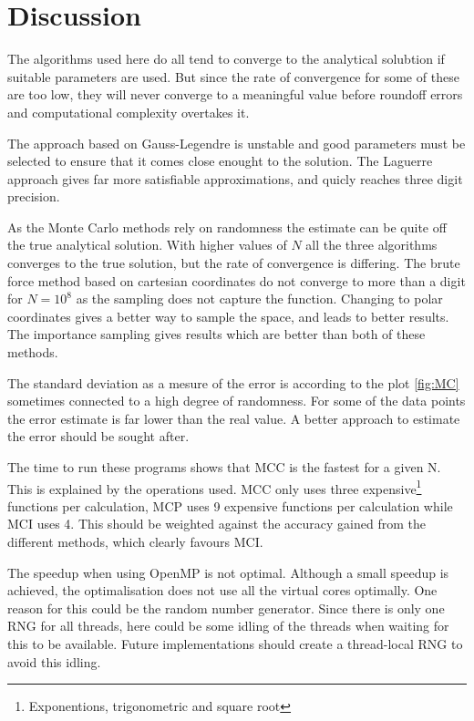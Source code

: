 \documentclass[11pt,a4paper,english,final]{article}
\numberwithin{equation}{section}
\begin{document}
\section{Discussion}

The algorithms used here do all tend to converge to the analytical 
solubtion if 
suitable parameters are used. But since the rate of convergence for 
some of these are too low, they will never converge to a meaningful 
value before roundoff errors and computational complexity overtakes it.

The approach based on Gauss-Legendre is unstable and good parameters 
must be selected to ensure that it comes close enought to the solution.
The Laguerre approach gives far more satisfiable approximations, and 
quicly reaches three digit precision.


As the Monte Carlo methods rely on randomness the estimate can be quite 
off the true analytical solution. With higher values of $N$ all the three 
algorithms converges to the true solution, but the rate of convergence
is differing. 
The brute force method based on cartesian coordinates do not converge 
to more than a digit for $N = 10^8$ as the sampling does not capture 
the function. 
Changing to polar coordinates gives a better way to sample the space, 
and leads to better results. The 
importance sampling gives results which are better than both of these 
methods.

The standard deviation as a mesure of the error is according to the 
plot \ref{fig:MC} sometimes connected to a high degree of randomness. 
For some of the data points the error estimate is far lower than 
the real value. A better approach to estimate the error should be 
sought after.

The time to run these programs shows that MCC is the fastest for a given N.
This is explained by the operations used. MCC only uses three 
expensive\footnote{ Exponentions, trigonometric and square root}
functions per calculation,
MCP uses 9 expensive functions per calculation while MCI uses 4. This
should be weighted against the accuracy gained from the different methods,
which clearly favours MCI. 

The speedup when using OpenMP is not optimal. Although a small speedup is
achieved, the optimalisation does not use all the virtual cores 
optimally. One reason for this could be the random number generator. 
Since there is only one RNG for all threads, here could be some idling 
of the threads when waiting for this to be available. Future 
implementations should create a thread-local RNG to avoid this idling.
\end{document}
